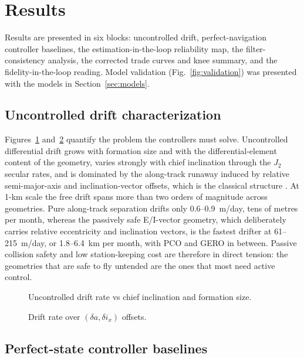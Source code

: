 \section{Results}\label{sec:results}

Results are presented in six blocks: uncontrolled drift, perfect-navigation
controller baselines, the estimation-in-the-loop reliability map, the
filter-consistency analysis, the corrected trade curves and knee summary,
and the fidelity-in-the-loop reading. Model validation
(Fig.~\ref{fig:validation}) was presented with the models in
Section~\ref{sec:models}.

\subsection{Uncontrolled drift characterization}

Figures~\ref{fig:drift} and~\ref{fig:contour} quantify the problem the
controllers must solve. Uncontrolled differential drift grows with formation
size and with the differential-element content of the geometry, varies
strongly with chief inclination through the $J_2$ secular rates, and is
dominated by the along-track runaway induced by relative semi-major-axis and
inclination-vector offsets, which is the classical structure
\cite{schaub2001j2invariant,alfriend2010formation}. At 1-km scale the free
drift spans more than two orders of magnitude across geometries. Pure
along-track separation drifts only 0.6--0.9~m/day, tens of metres per month,
whereas the passively safe E/I-vector geometry, which deliberately carries
relative eccentricity and inclination vectors, is the fastest drifter at
61--215~m/day, or 1.8--6.4~km per month, with PCO and GERO in between.
Passive collision safety and low station-keeping cost are therefore in
direct tension: the geometries that are safe to fly untended are the ones
that most need active control.

\begin{figure}[t]
  \centering
  \caption{Uncontrolled drift rate vs chief inclination and formation size.}
  \label{fig:drift}
\end{figure}
\begin{figure}[t]
  \centering
  \caption{Drift rate over $(\delta a, \delta i_x)$ offsets.}
  \label{fig:contour}
\end{figure}

\subsection{Perfect-state controller baselines}

